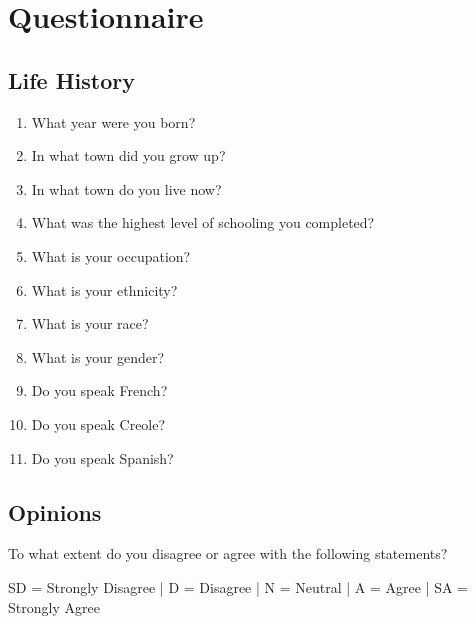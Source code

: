 

\section{Questionnaire}
  \subsection{Life History}
    \begin{enumerate}
      \item What year were you born? \hrulefill
      \item In what town did you grow up? \hrulefill
      \item In what town do you live now? \hrulefill
      \item What was the highest level of schooling you completed? \hrulefill
      \item What is your occupation? \hrulefill
      \item What is your ethnicity? \hrulefill
      \item What is your race? \hrulefill
      \item What is your gender? \hrulefill
      \item Do you speak French? \hrulefill
      \item Do you speak Creole? \hrulefill
      \item Do you speak Spanish? \hrulefill
    \end{enumerate}

  \subsection{Opinions}
    \noindent To what extent do you disagree or agree with the following statements?

    {\scriptsize
        \noindent SD = Strongly Disagree | D = Disagree | N = Neutral | A = Agree | SA = Strongly Agree
    }

